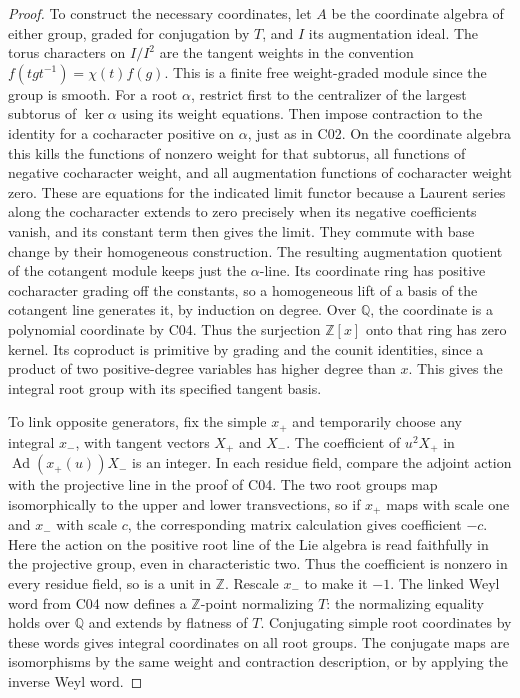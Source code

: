 \documentclass[11pt,a4paper,openany,oneside]{book}
\theoremstyle{resultstyle}
\theoremstyle{definition}
\numberwithin{equation}{chapter}
\newcommand{\ZZ}{\mathbb{Z}}
\newcommand{\QQ}{\mathbb{Q}}
\begin{document}
\begin{proof}
To construct the necessary coordinates, let \(A\) be the
coordinate algebra of either group, graded for conjugation
by \(T\), and \(I\) its augmentation ideal. The torus
characters on \(I/I^2\) are the tangent weights in the
convention \(f(tgt^{-1})=\chi(t)f(g)\). This is a finite
free weight-graded module since the group is smooth.
For a root \(\alpha\), restrict first to the centralizer of
the largest subtorus of \(\ker\alpha\) using its weight
equations. Then impose contraction to the identity for
a cocharacter positive on \(\alpha\), just as in C02.
On the coordinate algebra this kills the functions of
nonzero weight for that subtorus, all functions of negative
cocharacter weight, and all augmentation functions of
cocharacter weight zero. These are equations for the
indicated limit functor because a Laurent series along the
cocharacter extends to zero precisely when its negative
coefficients vanish, and its constant term then gives
the limit. They commute with base change by their
homogeneous construction. The resulting augmentation
quotient of the cotangent module keeps just the
\(\alpha\)-line. Its coordinate ring has positive
cocharacter grading off the constants, so a homogeneous
lift of a basis of the cotangent line generates it, by
induction on degree. Over \(\QQ\), the coordinate is a
polynomial coordinate by C04. Thus the surjection
\(\ZZ[x]\) onto that ring has zero kernel. Its coproduct
is primitive by grading and the counit identities, since
a product of two positive-degree variables has higher
degree than \(x\). This gives the integral root group
with its specified tangent basis.

To link opposite generators, fix the simple \(x_+\) and
temporarily choose any integral \(x_-\), with tangent
vectors \(X_+\) and \(X_-\). The coefficient of
\(u^2X_+\) in \(\operatorname{Ad}(x_+(u))X_-\)
is an integer. In each residue field, compare the adjoint
action with the projective line in the proof of C04.
The two root groups map isomorphically to the upper and
lower transvections, so if \(x_+\) maps with scale one and
\(x_-\) with scale \(c\), the corresponding matrix
calculation gives coefficient \(-c\). Here the action
on the positive root line of the Lie algebra is read
faithfully in the projective group, even in characteristic
two. Thus the coefficient is nonzero in every residue
field, so is a unit in \(\ZZ\). Rescale \(x_-\) to make it
\(-1\). The linked Weyl word from C04 now defines a
\(\ZZ\)-point normalizing \(T\): the normalizing equality
holds over \(\QQ\) and extends by flatness of \(T\).
Conjugating simple root coordinates by these words gives
integral coordinates on all root groups. The conjugate
maps are isomorphisms by the same weight and contraction
description, or by applying the inverse Weyl word.


\end{proof}
\end{document}
